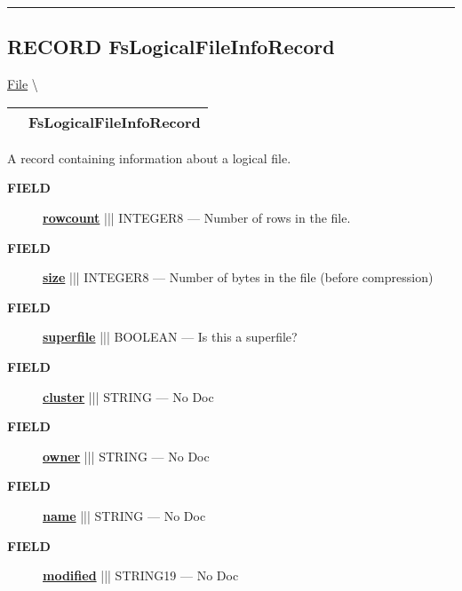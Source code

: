 \rule{\linewidth}{0.5pt}
\subsection*{\textsf{\colorbox{headtoc}{\color{white} RECORD}
FsLogicalFileInfoRecord}}

\hypertarget{ecldoc:file.fslogicalfileinforecord}{}
\hspace{0pt} \hyperlink{ecldoc:File}{File} \textbackslash 

{\renewcommand{\arraystretch}{1.5}
\begin{tabularx}{\textwidth}{|>{\raggedright\arraybackslash}l|X|}
\hline
\hspace{0pt}\mytexttt{\color{red} } & \textbf{FsLogicalFileInfoRecord} \\
\hline
\end{tabularx}
}

\par





A record containing information about a logical file.







\par
\begin{description}
\item [\colorbox{tagtype}{\color{white} \textbf{\textsf{FIELD}}}] \textbf{\underline{rowcount}} ||| INTEGER8 --- Number of rows in the file.
\item [\colorbox{tagtype}{\color{white} \textbf{\textsf{FIELD}}}] \textbf{\underline{size}} ||| INTEGER8 --- Number of bytes in the file (before compression)
\item [\colorbox{tagtype}{\color{white} \textbf{\textsf{FIELD}}}] \textbf{\underline{superfile}} ||| BOOLEAN --- Is this a superfile?
\item [\colorbox{tagtype}{\color{white} \textbf{\textsf{FIELD}}}] \textbf{\underline{cluster}} ||| STRING --- No Doc
\item [\colorbox{tagtype}{\color{white} \textbf{\textsf{FIELD}}}] \textbf{\underline{owner}} ||| STRING --- No Doc
\item [\colorbox{tagtype}{\color{white} \textbf{\textsf{FIELD}}}] \textbf{\underline{name}} ||| STRING --- No Doc
\item [\colorbox{tagtype}{\color{white} \textbf{\textsf{FIELD}}}] \textbf{\underline{modified}} ||| STRING19 --- No Doc
\end{description}







